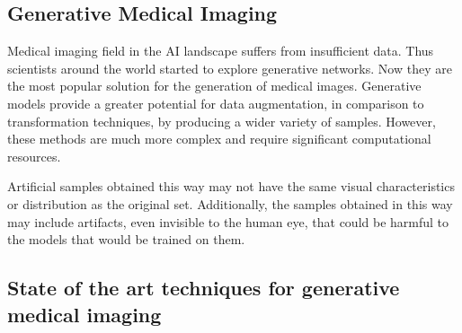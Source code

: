 


\subsection{Generative Medical Imaging}
Medical imaging field in the AI landscape suffers from insufficient data. Thus scientists around the world started to explore generative networks. Now they are the most popular solution for the generation of medical images\cite{osuala2023data}.
Generative models provide a greater potential for data augmentation, in comparison to transformation techniques, by producing a wider variety of samples. However, these methods are much more complex and require significant computational resources.

Artificial samples obtained this way may not have the same visual characteristics or distribution as the original set. Additionally, the samples obtained in this way may include artifacts, even invisible to the human eye, that could be harmful to the models that would be trained on them.
\subsection{State of the art techniques for generative medical imaging}